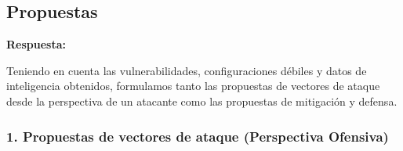 \subsection*{Propuestas}
\textbf{Respuesta:}

Teniendo en cuenta las vulnerabilidades, configuraciones débiles y datos de inteligencia obtenidos, formulamos tanto las propuestas de vectores de ataque desde la perspectiva de un atacante como las propuestas de mitigación y defensa.

\subsubsection*{1. Propuestas de vectores de ataque (Perspectiva Ofensiva)}

